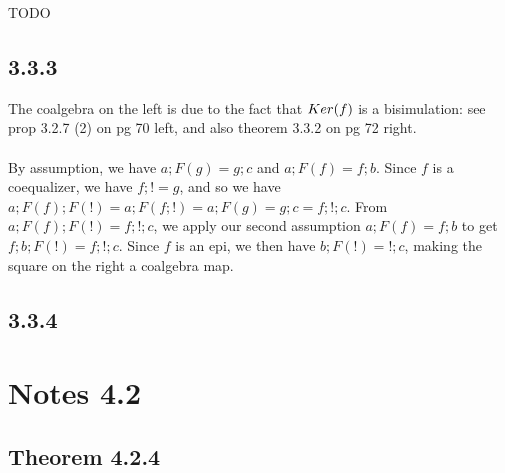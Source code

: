 \documentclass{article}
\begin{document}
TODO

\subsection*{3.3.3}

\begin{center}
\end{center}

The coalgebra on the left is due to the fact that $\mit{Ker}(f)$ is a bisimulation: see prop 3.2.7 (2) on pg 70 left,
and also theorem 3.3.2 on pg 72 right.\\~\\
By assumption, we have $a;F(g) = g;c$ and $a;F(f) = f;b$. Since $f$ is a coequalizer, we have $f;! = g$, and so
we have $a;F(f);F(!) = a;F(f;!) = a;F(g) = g;c = f;!;c$. From $a;F(f);F(!) = f;!;c$, we apply our second assumption
$a;F(f) = f;b$ to get $f;b;F(!) = f;!;c$. Since $f$ is an epi, we then have $b;F(!) = !;c$, making the square on
the right a coalgebra map.

\subsection*{3.3.4}

\section*{Notes 4.2}

\subsection*{Theorem 4.2.4}
\end{document}
